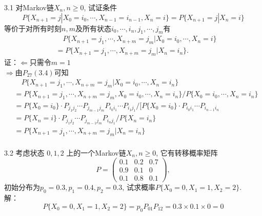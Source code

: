 

3.1 对Markov链$X_n, n \geqslant 0$, 试证条件
	\[
	P\{X_{n+1} = j | X_0 = i_0, \cdots , X_{n-1} = i_{n-1}, X_n = i\} = P\{X_{n+1} = j | X_n = i\}
	\]
	等价于对所有时刻$n, m$及所有状态$i_0, \cdots, i_n, j_1, \cdots, j_m$有
	\[
	\begin{split}
	& \quad P\{X_{n+1} = j_1, \cdots, X_{n+m} = j_m | X_0 = i_0, \cdots, X_n = i\}\\
	& = P\{X_{n+1} = j_1, \cdots, X_{n+m} = j_m | X_n = i_n\}.
	\end{split}
	\]
证：$\Leftarrow $只需令$m=1$\\
	$\Rightarrow $由$P_{27}(3.4)$可知\\
	\[
	\begin{split}
	& \quad P\{X_{n+1} = j_1, \cdots, X_{n+m} = j_m | X_0 = i_0, \cdots, X_n = i_n\}\\
	& = P\{X_{n+1} = j_1, \cdots, X_{n+m} = j_m , X_0 = i_0, \cdots, X_n = i_n\} / P\{X_0 = i_0, \cdots, X_n = i_n\}\\
	& = P\{X_0 = i_0\} \cdot P_{j_1j_2} \cdots P_{j_{m-1}j_m} P_{i_0i_1} \cdots P_{i_1j_1} / [P\{X_0 = i_0\} \cdot P_{i_0i_1} \cdots P_{i_{n-1}i_n}\\
	& = P\{X_n = i\} \cdot P_{j_1j_2} \cdots P_{j_{m-1}j_m} P_{i_nj_1} / P\{X_n = i_n\}\\
	& = P\{X_{n+1} = j_1, \cdots, X_{n+m} = j_m | X_n = i_n\}\\
	\end{split}
	\]


3.2 考虑状态 $ 0,1,2 $ 上的一个Markov链$X_n, n \geqslant 0$, 它有转移概率矩阵
	\[
	P = \begin{pmatrix}
	0.1 & 0.2 & 0.7 \\
	0.9 & 0.1 & 0 \\
	0.1 & 0.8 & 0.1 
	\end{pmatrix} ,
	\]
	初始分布为$p_0 = 0.3, p_1 = 0.4, p_2 = 0.3$, 试求概率$P\{X_0 = 0, X_1 = 1, X_2 = 2\}$.\\
解：
	\[
	P\{X_0 = 0, X_1 = 1, X_2 = 2\} = p_0P_{01}P_{12} = 0.3 \times 0.1 \times 0 = 0
	\]


